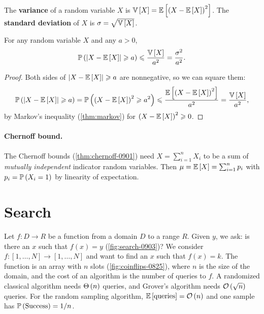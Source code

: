 \begin{definition}
    The \textbf{variance} of a random variable $X$ is
    $\operatorname{\mathbb{V}}\left[X\right] = \operatorname{\mathbb{E}}\left[\left(X - \operatorname{\mathbb{E}}\left[X\right]\right)^2\right]$.
    The \textbf{standard deviation} of $X$ is $\sigma = \sqrt{\operatorname{\mathbb{V}}\left[X\right]}$.
\end{definition}

\begin{theorem}\label{thm:chebyshev}
    For any random variable $X$ and any $a > 0$,
    \[\operatorname{\mathbb{P}}\left(\left\lvert X - \operatorname{\mathbb{E}}\left[X\right]\right\rvert \geqslant a\right) \leqslant \frac{\operatorname{\mathbb{V}}\left[X\right]}{a^2} = \frac{\sigma^2}{a^2}.\]
\end{theorem}

\begin{proof}
    Both sides of $\left\lvert X - \operatorname{\mathbb{E}}\left[X\right]\right\rvert \geqslant a$ are nonnegative, so we can square them:
    \[\operatorname{\mathbb{P}}\left(\left\lvert X - \operatorname{\mathbb{E}}\left[X\right]\right\rvert \geqslant a\right)
        = \operatorname{\mathbb{P}}\left(\left(X - \operatorname{\mathbb{E}}\left[X\right]\right)^2 \geqslant a^2\right)
        \leqslant \frac{\operatorname{\mathbb{E}}\left[\left(X - \operatorname{\mathbb{E}}\left[X\right]\right)^2\right]}{a^2}
        = \frac{\operatorname{\mathbb{V}}\left[X\right]}{a^2},\]
    by Markov's inequality (\cref{thm:markov}) for $\left(X - \operatorname{\mathbb{E}}\left[X\right]\right)^2 \geqslant 0$.
\end{proof}

\paragraph{Chernoff bound.}

The Chernoff bounds (\cref{thm:chernoff-0901}) need $X = \sum_{i=1}^{n} X_i$ to be a sum of
\emph{mutually independent} indicator random variables. Then
$\mu = \operatorname{\mathbb{E}}\left[X\right] = \sum_{i=1}^{n} p_i$ with $p_i = \operatorname{\mathbb{P}}\left(X_i = 1\right)$ by linearity of
expectation.

\section{Search}

Let $f \colon D \to R$ be a function from a domain $D$ to a range $R$.
Given $y$, we ask: is there an $x$ such that $f(x) = y$ (\cref{fig:search-0903})? We consider
$f \colon [1, \dots, N] \to [1, \dots, N]$ and want to find an $x$ such that $f(x) = k$. The
function is an array with $n$ slots (\cref{fig:coinflips-0825}), where $n$ is the size of the
domain, and the cost of an algorithm is the number of queries to $f$. A randomized classical
algorithm needs $\Theta\left(n\right)$ queries, and Grover's algorithm needs $\mathcal{O}\left(\sqrt{n}\right)$ queries. For
the random sampling algorithm, $\operatorname{\mathbb{E}}\left[\text{queries}\right] = \mathcal{O}\left(n\right)$ and one sample has
$\operatorname{\mathbb{P}}\left(\text{Success}\right) = 1/n$.

